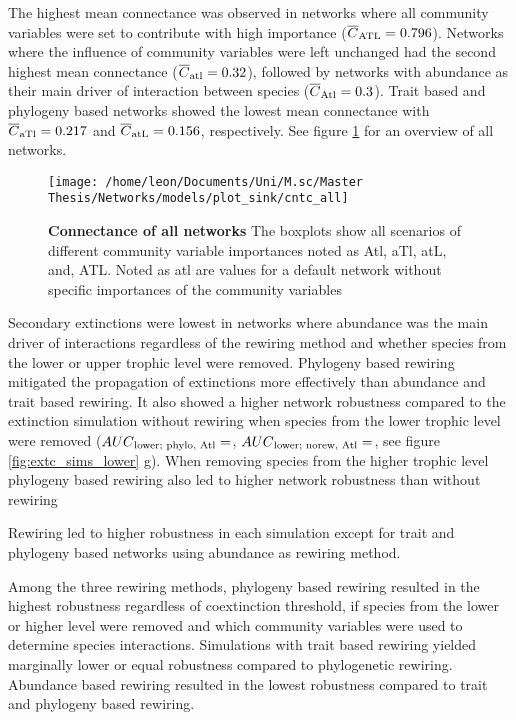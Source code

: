\documentclass[12pt,a4paper]{article}
\begin{document}
The highest mean connectance was observed in networks where all community variables were set to contribute with high importance ($\overline{C}\textsubscript{ATL} = 0.796$). Networks where the influence of community variables were left unchanged had the second highest mean connectance ($\overline{C}\textsubscript{atl} = 0.32$), followed by networks with abundance as their main driver of interaction between species ($\overline{C}\textsubscript{Atl} = 0.3$). Trait based and phylogeny based networks showed the lowest mean connectance with $\overline{C}\textsubscript{aTl} = 0.217$ and $\overline{C}\textsubscript{atL} = 0.156$, respectively. See figure \ref{fig:cntc} for an overview of all networks.
\begin{figure}[H]
	 \texttt{[image: /home/leon/Documents/Uni/M.sc/Master Thesis/Networks/models/plot\_sink/cntc\_all]}
	 \caption{\textbf{Connectance of all networks} The boxplots show all scenarios of different community variable importances noted as Atl, aTl, atL, and, ATL. Noted as atl are values for a default network without specific importances of the community variables}
	 \label{fig:cntc}
\end{figure}


Secondary extinctions were lowest in networks where abundance was the main driver of interactions regardless of the rewiring method and whether species from the lower or upper trophic level were removed. 
Phylogeny based rewiring mitigated the propagation of extinctions more effectively than abundance and trait based rewiring. It also showed a higher network robustness compared to the extinction simulation without rewiring when species from the lower trophic level were removed ($AUC\textsubscript{lower; phylo, Atl} = $, $AUC\textsubscript{lower; norew, Atl} = $, see figure \ref{fig:extc_sims_lower} g). When removing species from the higher trophic level phylogeny based rewiring also led to higher network robustness than without rewiring

Rewiring led to higher robustness in each simulation except for trait and phylogeny based networks using abundance as rewiring method.


Among the three rewiring methods, phylogeny based rewiring resulted in the highest robustness regardless of coextinction threshold, if species from the lower or higher level were removed and which community variables were used to determine species interactions. Simulations with trait based rewiring yielded marginally lower or equal robustness compared to phylogenetic rewiring. Abundance based rewiring resulted in the lowest robustness compared to trait and phylogeny based rewiring.
\end{document}
